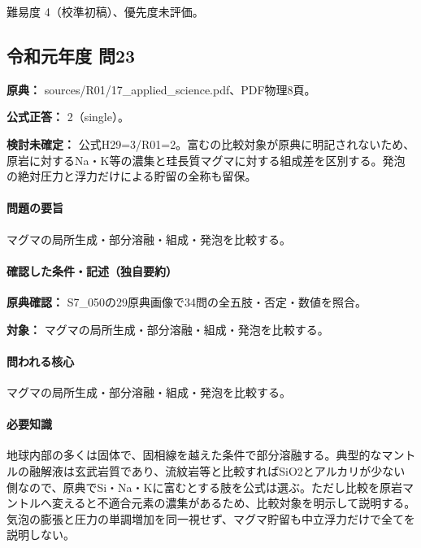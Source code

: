 \par 難易度 4（校準初稿）、優先度未評価。

\subsection{令和元年度 問23}
\label{q:r01-reg-applied-23}

\noindent\textbf{原典：} sources/R01/17\_applied\_science.pdf、PDF物理8頁。

\textbf{公式正答：} 2（single）。

\par\textbf{検討未確定：} 公式H29=\allowbreak{}3/R01=\allowbreak{}2。富むの比較対象が原典に明記されないため、原岩に対するNa・K等の濃集と珪長質マグマに対する組成差を区別する。発泡の絶対圧力と浮力だけによる貯留の全称も留保。

\paragraph{問題の要旨} マグマの局所生成・部分溶融・組成・発泡を比較する。

\paragraph{確認した条件・記述（独自要約）}\mbox{}\par

\noindent\textbf{原典確認：} S7\_050の29原典画像で34問の全五肢・否定・数値を照合。\par

\noindent\textbf{対象：} マグマの局所生成・部分溶融・組成・発泡を比較する。\par

\paragraph{問われる核心} マグマの局所生成・部分溶融・組成・発泡を比較する。

\paragraph{必要知識} 地球内部の多くは固体で、固相線を越えた条件で部分溶融する。典型的なマントルの融解液は玄武岩質であり、流紋岩等と比較すればSiO2とアルカリが少ない側なので、原典でSi・Na・Kに富むとする肢を公式は選ぶ。ただし比較を原岩マントルへ変えると不適合元素の濃集があるため、比較対象を明示して説明する。気泡の膨張と圧力の単調増加を同一視せず、マグマ貯留も中立浮力だけで全てを説明しない。

